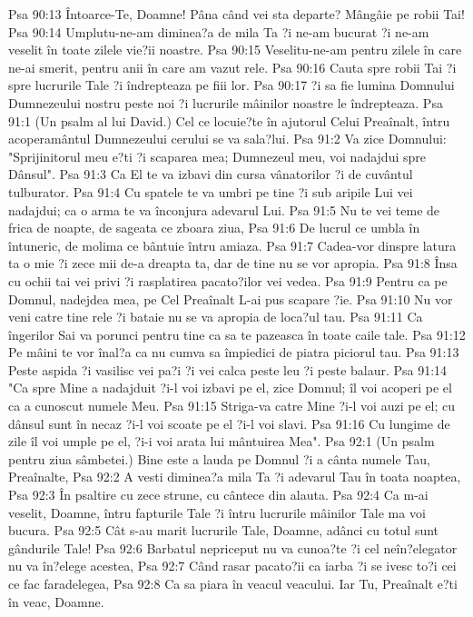 Psa 90:13  Întoarce-Te, Doamne! Pâna când vei sta departe? Mângâie pe robii Tai!
Psa 90:14  Umplutu-ne-am diminea?a de mila Ta ?i ne-am bucurat ?i ne-am veselit în toate zilele vie?ii noastre.
Psa 90:15  Veselitu-ne-am pentru zilele în care ne-ai smerit, pentru anii în care am vazut rele.
Psa 90:16  Cauta spre robii Tai ?i spre lucrurile Tale ?i îndrepteaza pe fiii lor.
Psa 90:17  ?i sa fie lumina Domnului Dumnezeului nostru peste noi ?i lucrurile mâinilor noastre le îndrepteaza.
Psa 91:1  (Un psalm al lui David.) Cel ce locuie?te în ajutorul Celui Preaînalt, întru acoperamântul Dumnezeului cerului se va sala?lui.
Psa 91:2  Va zice Domnului: "Sprijinitorul meu e?ti ?i scaparea mea; Dumnezeul meu, voi nadajdui spre Dânsul".
Psa 91:3  Ca El te va izbavi din cursa vânatorilor ?i de cuvântul tulburator.
Psa 91:4  Cu spatele te va umbri pe tine ?i sub aripile Lui vei nadajdui; ca o arma te va înconjura adevarul Lui.
Psa 91:5  Nu te vei teme de frica de noapte, de sageata ce zboara ziua,
Psa 91:6  De lucrul ce umbla în întuneric, de molima ce bântuie întru amiaza.
Psa 91:7  Cadea-vor dinspre latura ta o mie ?i zece mii de-a dreapta ta, dar de tine nu se vor apropia.
Psa 91:8  Însa cu ochii tai vei privi ?i rasplatirea pacato?ilor vei vedea.
Psa 91:9  Pentru ca pe Domnul, nadejdea mea, pe Cel Preaînalt L-ai pus scapare ?ie.
Psa 91:10  Nu vor veni catre tine rele ?i bataie nu se va apropia de loca?ul tau.
Psa 91:11  Ca îngerilor Sai va porunci pentru tine ca sa te pazeasca în toate caile tale.
Psa 91:12  Pe mâini te vor înal?a ca nu cumva sa împiedici de piatra piciorul tau.
Psa 91:13  Peste aspida ?i vasilisc vei pa?i ?i vei calca peste leu ?i peste balaur.
Psa 91:14  "Ca spre Mine a nadajduit ?i-l voi izbavi pe el, zice Domnul; îl voi acoperi pe el ca a cunoscut numele Meu.
Psa 91:15  Striga-va catre Mine ?i-l voi auzi pe el; cu dânsul sunt în necaz ?i-l voi scoate pe el ?i-l voi slavi.
Psa 91:16  Cu lungime de zile îl voi umple pe el, ?i-i voi arata lui mântuirea Mea".
Psa 92:1  (Un psalm pentru ziua sâmbetei.) Bine este a lauda pe Domnul ?i a cânta numele Tau, Preaînalte,
Psa 92:2  A vesti diminea?a mila Ta ?i adevarul Tau în toata noaptea,
Psa 92:3  În psaltire cu zece strune, cu cântece din alauta.
Psa 92:4  Ca m-ai veselit, Doamne, întru fapturile Tale ?i întru lucrurile mâinilor Tale ma voi bucura.
Psa 92:5  Cât s-au marit lucrurile Tale, Doamne, adânci cu totul sunt gândurile Tale!
Psa 92:6  Barbatul nepriceput nu va cunoa?te ?i cel neîn?elegator nu va în?elege acestea,
Psa 92:7  Când rasar pacato?ii ca iarba ?i se ivesc to?i cei ce fac faradelegea,
Psa 92:8  Ca sa piara în veacul veacului. Iar Tu, Preaînalt e?ti în veac, Doamne.
